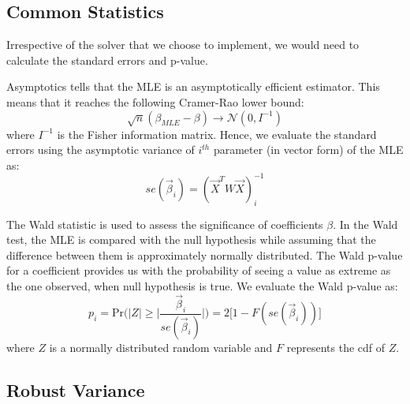 \documentclass[12pt]{article}
\begin{document}
\subsection*{Common Statistics}\label{sec:stats}
Irrespective of the solver that we choose to implement, we would need to calculate the standard errors and p-value. 

Asymptotics tells that the MLE is an asymptotically efficient estimator. This means that  it reaches the following Cramer-Rao lower bound:
\begin{equation}
\sqrt{n}(\beta_{MLE} - \beta) \rightarrow \mathcal{N}(0,I^{-1})
\end{equation} 
where $I^{-1}$ is the Fisher information matrix. Hence, we evaluate the standard errors using  the asymptotic variance of $i^{th}$ parameter (in vector form) of the MLE as:
\begin{equation}
se(\vec{\beta}_i) = (\vec{X}^{T} W \vec{X})^{-1}_{i}
\end{equation}

The Wald statistic is used to assess the significance of coefficients $\beta$. In the Wald test, the MLE is compared with the null hypothesis while assuming that the difference between them is approximately normally distributed. The Wald p-value for a coefficient provides us with the probability of seeing a value as extreme as the one observed, when null hypothesis is true. We evaluate the Wald p-value as:
\begin{equation}
p_i = \mbox{Pr}\Big(|Z| \geq \big|\frac{\vec{\beta}_i}{se(\vec{\beta}_i)} \big| \Big) = 2 \Big[1 - F(se(\vec{\beta}_i)) \Big]
\end{equation}
where $Z$ is a normally distributed random variable and $F$ represents the cdf of $Z$.

\subsection{Robust Variance}
\end{document}
